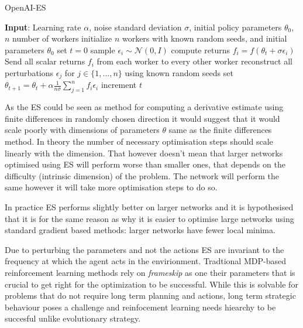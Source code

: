 \begin{algorithm}
    \begin{algorithmic}[1]
    \caption{OpenAI-ES}
    \label{alg:openai-es}
        \State \textbf{Input}: Learning rate $\alpha$, noise standard deviation $\sigma$, initial policy parameters $\theta_0$, $n$ number of workers
        \State initialize $n$ workers with known random seeds, and initial parameters $\theta_0$
        \State set $t=0$
        \Repeat
                \State sample $\epsilon_i \sim \mathcal{N}(0,I)$ 
                \State compute returns $f_i = f(\theta_t+\sigma\epsilon_i)$
            \EndFor
            \State Send all scalar returns $f_i$ from each worker to every other worker
                \State reconstruct all perturbations $\epsilon_j $ for $j \in \{1,\dots,n\}$ using known random seeds
                \State set $\theta_{t+1} = \theta_t + \alpha \frac{1}{n\sigma}\sum_{j=1}^nf_i\epsilon_i$
            \EndFor
            \State increment $t$
    \end{algorithmic}
\end{algorithm}

As the ES could be seen as method for computing a derivative estimate using finite differences in randomly chosen direction it would suggest that it would scale poorly with dimensions of parameters $\theta$ same as the finite differences method. In theory the number of necessary optimisation steps should scale linearly with the dimension. That however doesn't mean that larger networks optimised using ES will perform worse than smaller ones, that depends on the difficulty (intrinsic dimension) of the problem. The network will perform the same however it will take more optimisation steps to do so. 

In practice ES performs slightly better on larger networks and it is hypothesised that it is for the same reason as why it is easier to optimise large networks using standard gradient based methods: larger networks have fewer local minima. 

Due to perturbing the parameters and not the actions ES are invariant to the frequency at which the agent acts in the envirionment. Tradtional MDP-based reinforcement learning methods rely on \emph{frameskip} as one their parameters that is crucial to get right for the optimization to be successful. While this is solvable for problems that do not require long term planning and actions, long term strategic behaviour poses a challenge and reinfocement learning needs hiearchy to be succesful unlike evolutionary strategy.


